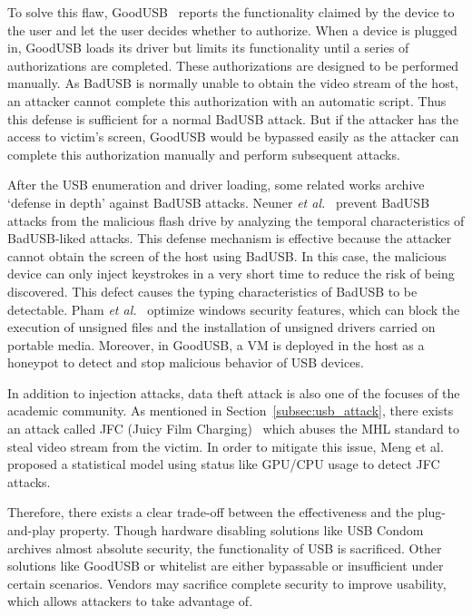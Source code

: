 To solve this flaw, GoodUSB~\cite{tian2015defending} reports the functionality claimed
by the device to the user and let the user decides whether to authorize. When a device
is plugged in, GoodUSB loads its driver but limits its functionality until a
series of authorizations are completed. These authorizations are designed to be
performed manually. As BadUSB is normally unable to obtain the video stream of
the host, an attacker cannot complete this authorization with
an automatic script. Thus this defense is sufficient for a normal BadUSB attack. But
if the attacker has the access to victim's screen, GoodUSB would be bypassed
easily as the attacker can complete this authorization manually and
perform subsequent attacks.

After the USB enumeration and driver loading, some related works
archive `defense in depth'
against BadUSB attacks.  Neuner \emph{et al.}~\cite{neuner2018usblock}
prevent BadUSB attacks from the malicious flash drive by analyzing
the temporal characteristics of BadUSB-liked attacks. This defense mechanism is
effective because the attacker cannot obtain the screen of the host using
BadUSB. In this case, the malicious device can only inject keystrokes in a very
short time to reduce the risk of being discovered. This defect causes the
typing characteristics of BadUSB to be detectable. Pham \emph{et al.}~\cite{pham2010optimizing} optimize windows security features, which can
block the execution of unsigned files and the installation of unsigned drivers
carried on portable media. Moreover, in GoodUSB, a VM is deployed in the host as
a honeypot to detect and stop malicious behavior of USB devices.

In addition to injection attacks, data theft attack is also one of the focuses
of the academic community. As mentioned in Section~\ref{subsec:usb_attack}, there
exists an attack called JFC (Juicy Film Charging)~\cite{JFC} which abuses the MHL
standard to steal video stream from the victim. In order to mitigate this
issue, Meng et al.~\cite{meng2018252} proposed a statistical model using status
like GPU/CPU usage to detect JFC attacks.

Therefore, there exists a clear trade-off between the effectiveness and the
plug-and-play property. Though hardware disabling solutions like USB Condom
archives almost absolute security, the functionality of USB is sacrificed.
Other solutions like GoodUSB or whitelist are either bypassable or insufficient
under certain scenarios. Vendors may sacrifice complete security to
improve usability, which allows attackers to take advantage of.

